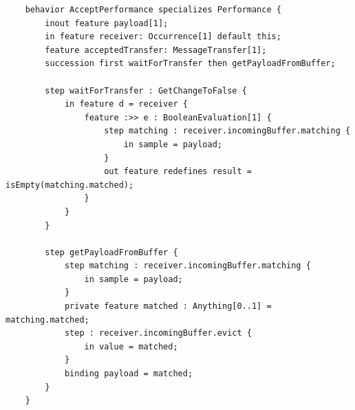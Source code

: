 \begin{lstlisting}
	behavior AcceptPerformance specializes Performance {
		inout feature payload[1];
		in feature receiver: Occurrence[1] default this;
		feature acceptedTransfer: MessageTransfer[1];
		succession first waitForTransfer then getPayloadFromBuffer;

		step waitForTransfer : GetChangeToFalse {
			in feature d = receiver {
				feature :>> e : BooleanEvaluation[1] {
					step matching : receiver.incomingBuffer.matching {
						in sample = payload;
					}
					out feature redefines result = isEmpty(matching.matched);
				}
			}
		}

		step getPayloadFromBuffer {
			step matching : receiver.incomingBuffer.matching {
				in sample = payload;
			}
			private feature matched : Anything[0..1] = matching.matched;
			step : receiver.incomingBuffer.evict {
				in value = matched;
			}
			binding payload = matched;
		}
	}
\end{lstlisting}

%
%



